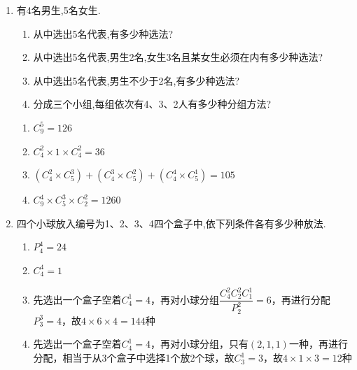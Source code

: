 \begin{enumerate}
\item 有4名男生,5名女生.
\begin{enumerate}
    \item 从中选出5名代表,有多少种选法?
    \item 从中选出5名代表,男生2名,女生3名且某女生必须在内有多少种选法?
    \item 从中选出5名代表,男生不少于2名,有多少种选法?
    \item 分成三个小组,每组依次有4、3、2人有多少种分组方法?
\end{enumerate}
\begin{jieda}
    \begin{enumerate}
        \item ${C}_{9}^{5} = {126}$
        \item $ {C}_{4}^{2} \times  1 \times  {C}_{4}^{2} = {36}$
        \item $\left( {{C}_{4}^{2} \times  {C}_{5}^{3}}\right)  + \left( {{C}_{4}^{3} \times  {C}_{5}^{2}}\right)  + \left( {{C}_{4}^{4} \times  {C}_{5}^{1}}\right)  = {105}$
        \item ${C}_{9}^{4} \times  {C}_{5}^{3} \times  {C}_{2}^{2} = {1260}$
    \end{enumerate}
\end{jieda}

\item 四个小球放入编号为1、2、3、4四个盒子中,依下列条件各有多少种放法.
\begin{jieda}
    \begin{enumerate}
        \item $P_4^4 = 24$
        \item $C_4^4 = 1$
        \item 先选出一个盒子空着$C_4^1 = 4$，再对小球分组$\dfrac{C_4^2C_2^2C_1^1}{P_2^2} = 6$，再进行分配$P_3^3 = 4$，故$4 \times 6 \times 4 = 144$种
        \item 先选出一个盒子空着$C_4^1 = 4$，再对小球分组，只有$(2,1,1)$一种，再进行分配，相当于从3个盒子中选择1个放2个球，故$C _3^1 = 3$，故$4 \times 1 \times 3 = 12$种
    \end{enumerate}
\end{jieda}


\end{enumerate}
